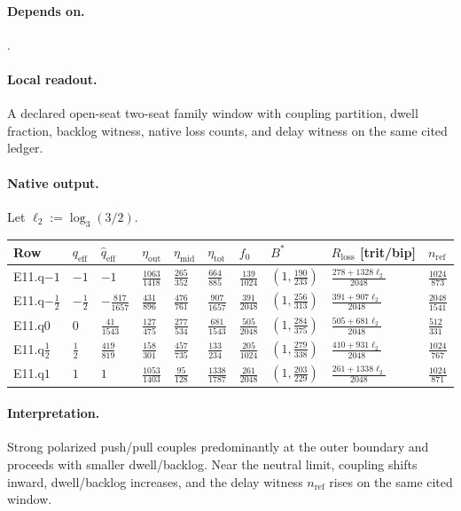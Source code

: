\paragraph{Depends on.} .
\paragraph{Local readout.} A declared open-seat two-seat family window with coupling partition, dwell fraction, backlog witness, native loss counts, and delay witness on the same cited ledger.
\paragraph{Native output.} Let $\ell_2:=\log_3(3/2)$.
{\scriptsize
\begin{center}
\begin{tabular}{@{}llllllllll@{}}
\toprule
Row & $q_{\mathrm{eff}}$ & $\widehat q_{\mathrm{eff}}$ & $\eta_{\mathrm{out}}$ & $\eta_{\mathrm{mid}}$ & $\eta_{\mathrm{tot}}$ & $f_0$ & $B^*$ & $R_{\mathrm{loss}}$ [trit/bip] & $n_{\mathrm{ref}}$ \\
\midrule
E11.q$-1$ & $-1$ & $-1$ & $\frac{1063}{1418}$ & $\frac{265}{352}$ & $\frac{664}{885}$ & $\frac{139}{1024}$ & $(1,\frac{190}{233})$ & $\frac{278+1328\ell_2}{2048}$ & $\frac{1024}{873}$ \\
E11.q$-\frac12$ & $-\frac12$ & $-\frac{817}{1657}$ & $\frac{431}{896}$ & $\frac{476}{761}$ & $\frac{907}{1657}$ & $\frac{391}{2048}$ & $(1,\frac{256}{313})$ & $\frac{391+907\ell_2}{2048}$ & $\frac{2048}{1541}$ \\
E11.q$0$ & $0$ & $\frac{41}{1543}$ & $\frac{127}{475}$ & $\frac{277}{534}$ & $\frac{681}{1543}$ & $\frac{505}{2048}$ & $(1,\frac{284}{375})$ & $\frac{505+681\ell_2}{2048}$ & $\frac{512}{331}$ \\
E11.q$\frac12$ & $\frac12$ & $\frac{419}{819}$ & $\frac{158}{301}$ & $\frac{457}{735}$ & $\frac{133}{234}$ & $\frac{205}{1024}$ & $(1,\frac{279}{338})$ & $\frac{410+931\ell_2}{2048}$ & $\frac{1024}{767}$ \\
E11.q$1$ & $1$ & $1$ & $\frac{1053}{1403}$ & $\frac{95}{128}$ & $\frac{1338}{1787}$ & $\frac{261}{2048}$ & $(1,\frac{203}{229})$ & $\frac{261+1338\ell_2}{2048}$ & $\frac{1024}{871}$ \\
\bottomrule
\end{tabular}
\end{center}}
\paragraph{Interpretation.} Strong polarized push/pull couples predominantly at the outer boundary and proceeds with smaller dwell/backlog. Near the neutral limit, coupling shifts inward, dwell/backlog increases, and the delay witness $n_{\mathrm{ref}}$ rises on the same cited window.
